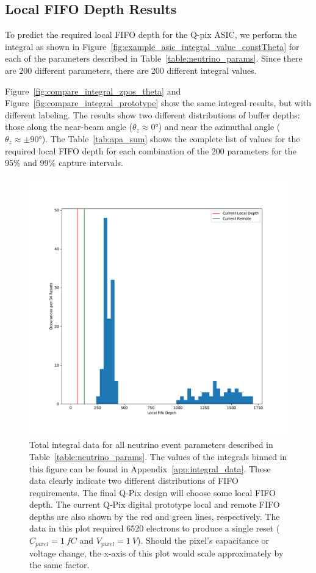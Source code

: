 \subsection{Local FIFO Depth Results}
To predict the required local FIFO depth for the Q-pix ASIC, we perform the integral as shown in Figure~\ref{fig:example_asic_integral_value_constTheta} for each of the parameters described in Table~\ref{table:neutrino_params}. 
Since there are 200 different parameters, there are 200 different integral values.

Figure~\ref{fig:compare_integral_zpos_theta} and Figure~\ref{fig:compare_integral_prototype} show the same integral results, but with different labeling.
The results show two different distributions of buffer depths: those along the near-beam angle ($\theta_{z} \approx 0$\unit{\degree}) and near the azimuthal angle ($\theta_{z} \approx \pm 90$\unit{\degree}). 
The Table~\ref{tab:apa_sum} shows the complete list of values for the required local FIFO depth for each combination of the 200 parameters for the 95\% and 99\% capture intervals.

\begin{figure}[]
\centering
\includegraphics[width=\textwidth]{images/df_nolabel_line.pdf}
\caption{Total integral data for all neutrino event parameters described in Table~\ref{table:neutrino_params}.
The values of the integrals binned in this figure can be found in Appendix~\ref{app:integral_data}.
These data clearly indicate two different distributions of FIFO requirements.
The final Q-Pix design will choose some local FIFO depth.
The current Q-Pix digital prototype local and remote FIFO depths are also shown by the red and green lines, respectively.
The data in this plot required 6520 electrons to produce a single reset ($C_{pixel} = 1~\unit{fC}$ and $V_{pixel} = 1~\unit{V}$).
Should the pixel's capacitance or voltage change, the x-axis of this plot would scale approximately by the same factor.
}
\end{figure}~\label{fig:compare_integral_prototype}


